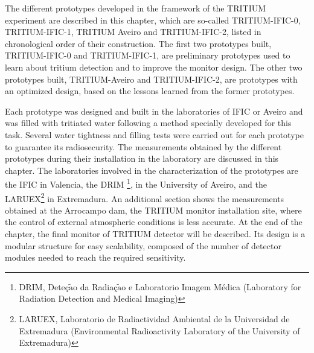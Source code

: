 The different prototypes developed in the framework of the TRITIUM experiment are described in this chapter, which are so-called TRITIUM-IFIC-0, TRITIUM-IFIC-1, TRITIUM Aveiro and TRITIUM-IFIC-2, listed in chronological order of their construction. The first two prototypes built, TRITIUM-IFIC-0 and TRITIUM-IFIC-1, are preliminary prototypes used to learn about tritium detection and to improve the monitor design. The other two prototypes built, TRITIUM-Aveiro and TRITIUM-IFIC-2, are prototypes with an optimized design, based on the lessons learned from the former prototypes.

Each prototype was designed and built in the laboratories of IFIC or Aveiro and was filled with tritiated water following a method specially developed for this task. Several water tightness and filling tests were carried out for each prototype to guarantee its radiosecurity. The measurements obtained by the different prototypes during their installation in the laboratory are discussed in this chapter. The laboratories involved in the characterization of the prototypes are the IFIC in Valencia, the DRIM \footnote{DRIM, Deteç$\tilde{\text{a}}$o da Radiaç$\tilde{\text{a}}$o e Laboratorio Imagem Médica (Laboratory for Radiation Detection and Medical Imaging)}, in the University of Aveiro, and the LARUEX\footnote{LARUEX, Laboratorio de Radiactividad Ambiental de la Universidad de Extremadura (Environmental Radioactivity Laboratory of the University of Extremadura)} in Extremadura. An additional section shows the measurements obtained at the Arrocampo dam, the TRITIUM monitor installation site, where the control of external atmospheric conditions is less accurate. At the end of the chapter, the final monitor of TRITIUM detector will be described. Its design is a modular structure for easy scalability, composed of the number of detector modules needed to reach the required sensitivity.